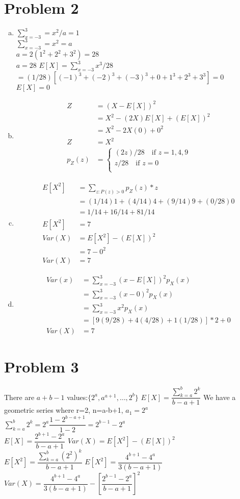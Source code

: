 \documentclass{article}
\begin{document}
\begin{flushleft}
\section*{Problem 2}
\begin{enumerate}[(a)]
\item
$\sum_{x=-3}^3=x^2/a=1$\\
$\sum_{x=-3}^3=x^2=a$\\
$a=2(1^2+2^2+3^2)=28$\\
$a=28$\medbreak
$E[X]=\sum_{x=-3}^{3}x^3/28$\\
$=(1/28)[(-1)^3+(-2)^3+(-3)^3+0+1^3+2^3+3^3]=0$\\
$E[X]=0$
\item
\begin{align*}
Z&=(X-E[X])^2\\
&=X^2-(2X)E[X]+(E[X])^2\\
&=X^2-2X(0)+0^2\\
Z&=X^2\\
p_Z(z)&=\begin{cases}
(2z)/28 \quad \text{if } z=1,4,9\\
z/28 \quad \text{if } z=0\\
\end{cases}
\end{align*}
\item 
\begin{align*}
E[X^2]&=\sum_{z:P(z)>0} p_Z(z)*z\\
&=(1/14)1+(4/14)4+(9/14)9+(0/28)0\\
&=1/14+16/14+81/14\\
E[X^2]&=7\\
Var(X)&=E[X^2]-(E[X])^2\\
&=7-0^2\\
Var(X)&=7
\end{align*}
\item
\begin{align*}
Var(x)&=\sum_{x=-3}^{3}(x-E[X])^2p_X(x)\\
&=\sum_{x=-3}^{3}(x-0)^2p_X(x)\\
&=\sum_{x=-3}^{3}x^2p_X(x)\\
&=[9(9/28)+4(4/28)+1(1/28)]*2+0\\
Var(X)&=7
\end{align*}
\end{enumerate}
\section*{Problem 3}
There are $a+b-1$ values:$\{2^a,a^{a+1},\dots,2^b\}$\medbreak
$E[X]=\dfrac{\sum_{k=a}^{b}2^k}{b-a+1}$\medbreak
We have a geometric series where r=2, n=a-b+1, $a_1=2^a$ \medbreak
$\sum_{k=a}^{b}2^k=2^a\dfrac{1-2^{b-a+1}}{1-2}=2^{b-1}-2^a$\\
$E[X]=\dfrac{2^{b+1}-2^a}{b-a+1}$\medbreak
$Var(X)=E[X^2]-(E[X])^2$\\
$E[X^2]=\dfrac{\sum_{k=a}^{b}(2^2)^k}{b-a+1}$\medbreak
$E[X^2]=\dfrac{4^{b+1}-4^a}{3(b-a+1)}$\medbreak
$Var(X)=\dfrac{4^{b+1}-4^a}{3(b-a+1)}-\left[\dfrac{2^{b-1}-2^a}{b-a+1}\right]^2$

\end{flushleft}
\end{document}
